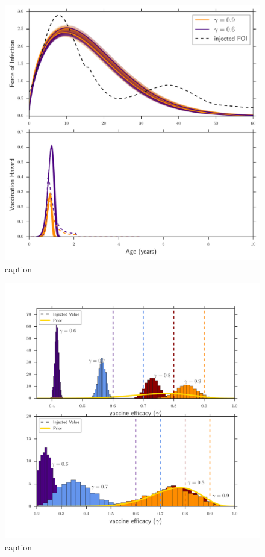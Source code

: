 \documentclass[nofootinbib,aps,pre,twocolumn,superscriptaddress,showkeys,showpacs]{revtex4-1}
\begin{document}
\begin{figure}
\includegraphics[width=\columnwidth,angle=0]{figures/foivhaz_fakedata_vaxserocase.pdf}
\caption{caption\label{fig:foivhsimdata}}
\end{figure}

\begin{figure}
\includegraphics[width=\columnwidth,angle=0]{figures/veff_fakedata.pdf}
\caption{caption\label{fig:veffsimdata}}
\end{figure}
\end{document}
